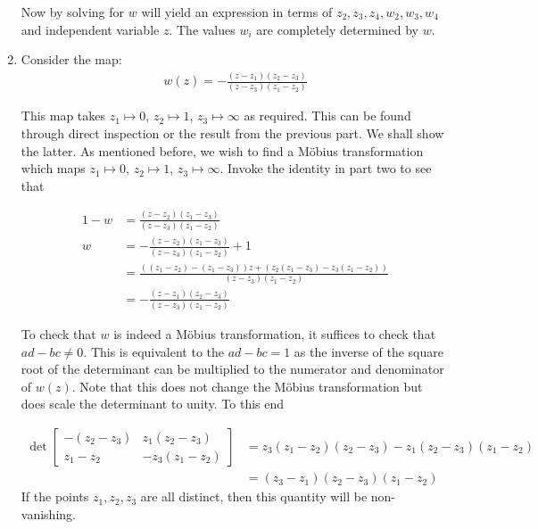 \documentclass[12pt]{article}%
\begin{document}
\begin{enumerate}
  Now by solving for $w$ will yield an expression in terms of $z_2,z_3,z_4,w_2,w_3,w_4$ and independent variable $z$. The values $w_i$ are completely determined by $w$.

  \item
  Consider the map:
  \begin{align*}
      w(z) = - \frac{(z -z_1)(z_2-z_3)}{(z - z_3)(z_1 - z_2)}
  \end{align*}

  This map takes $z_1 \mapsto 0$, $z_2 \mapsto 1$, $z_3 \mapsto \infty$ as required. This can be found through direct inspection or the result from the previous part. We shall show the latter. As mentioned before, we wish to find a M\"{o}bius transformation which maps $z_1 \mapsto 0$, $z_2 \mapsto 1$, $z_3 \mapsto \infty$. Invoke the identity in part two to see that

  \begin{align*}
      1 - w & = \frac{(z-z_2)(z_1-z_3)}{(z-z_3)(z_1-z_2)} \\
       w  & = -  \frac{(z-z_2)(z_1-z_3)}{(z-z_3)(z_1-z_2)} + 1 \\
      & = \frac{((z_1 - z_2) - (z_1 - z_3))z + (z_2(z_1 - z_3) - z_3(z_1 - z_2))}{(z-z_3)(z_1-z_2)} \\
      & =  - \frac{(z -z_1)(z_2-z_3)}{(z - z_3)(z_1 - z_2)}
  \end{align*}





  To check that $w$ is indeed a M\"{o}bius transformation, it suffices to check that $ad - bc \neq 0$. This is equivalent to the $ad - bc = 1$ as the inverse of the square root of the determinant can be multiplied to the numerator and denominator of $w(z)$. Note that this does not change the M\"{o}bius transformation but does scale the determinant to unity. To this end

  \begin{align*}
    \det \begin{bmatrix}
        -(z_2 - z_3) & z_1(z_2 - z_3) \\
        z_1 - z_2 & -z_3(z_1 - z_2)
  \end{bmatrix} & = z_3(z_1 - z_2)(z_2 - z_3) - z_1(z_2 - z_3)(z_1 - z_2) \\
  & = (z_3 - z_1)(z_2 - z_3)(z_1 - z_2)
  \end{align*}
  If the points $z_1,z_2,z_3$ are all distinct, then this quantity will be non-vanishing.
\end{enumerate}
\end{document}
